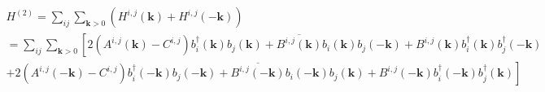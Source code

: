 \documentclass[a4paper,12pt]{article}
\begin{document}
            \begin{multline}
                H^{(2)} = \sum_{ij}\sum_{\boldsymbol{k} > 0} \left(H^{i,j}(\boldsymbol{k}) + H^{i,j}(-\boldsymbol{k})\right) \\
                = \sum_{ij}\sum_{\boldsymbol{k} > 0}\left[2(A^{i,j}(\boldsymbol{k}) - C^{i,j})b^{\dag}_{i}(\boldsymbol{k})b_{j}(\boldsymbol{k}) + 
                \overline{B^{i,j}(\boldsymbol{k})}b_{i}(\boldsymbol{k})b_{j}(-\boldsymbol{k}) +
                B^{i,j}(\boldsymbol{k})b^{\dag}_{i}(\boldsymbol{k})b^{\dag}_{j}(-\boldsymbol{k})\right. \\
                +\left.2(A^{i,j}(-\boldsymbol{k}) - C^{i,j})b^{\dag}_{i}(-\boldsymbol{k})b_{j}(-\boldsymbol{k}) + 
                \overline{B^{i,j}(-\boldsymbol{k})}b_{i}(-\boldsymbol{k})b_{j}(\boldsymbol{k}) +
                B^{i,j}(-\boldsymbol{k})b^{\dag}_{i}(-\boldsymbol{k})b^{\dag}_{j}(\boldsymbol{k})\right]\label{eq:ham-colpa-rewritten}
            \end{multline}
\end{document}

